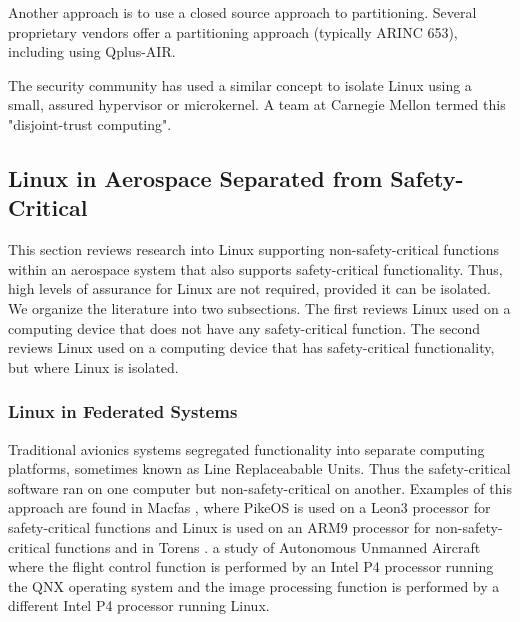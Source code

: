 Another approach is to use a closed source approach to partitioning. Several proprietary vendors offer a partitioning approach (typically ARINC 653), including \cite{lim2021autonomous} using Qplus-AIR.

The security community has used a similar concept to isolate Linux using a small, assured hypervisor or microkernel. A team at Carnegie Mellon\cite{de2019mixed} termed this "disjoint-trust computing". 

\subsection{Linux in Aerospace Separated from Safety-Critical}

This section reviews research into Linux supporting non-safety-critical functions within an aerospace system that also supports safety-critical functionality. Thus, high levels of assurance for Linux are not required, provided it can be isolated. We organize the literature into two subsections. The first reviews Linux used on a computing device that does not have any safety-critical function. The second reviews Linux used on a computing device that has safety-critical functionality, but where Linux is isolated.

\subsubsection{Linux in Federated Systems}
Traditional avionics systems segregated functionality into separate computing platforms, sometimes known as Line Replaceabable Units. Thus the safety-critical software ran on one computer but non-safety-critical on another. Examples of this approach are found in Macfas \cite{macias2013open}, where PikeOS is used on a Leon3 processor for safety-critical functions and Linux is used on an ARM9 processor for non-safety-critical functions and in Torens \cite{torens2014certification}. a study of Autonomous Unmanned Aircraft where the flight control function is performed by an Intel P4 processor running the QNX operating system and the image processing function is performed by a different Intel P4 processor running Linux.
